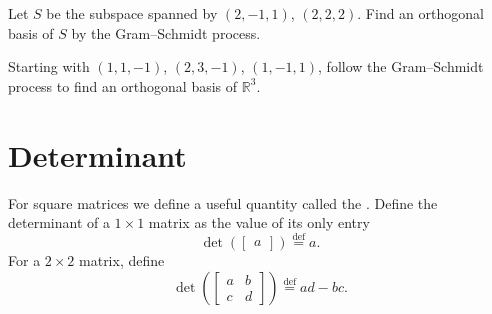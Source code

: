 \begin{exercise}
Let $S$ be the subspace spanned by
$(2,-1,1)$, $(2,2,2)$.  Find an orthogonal basis of $S$
by the Gram--Schmidt process.
\end{exercise}

\begin{exercise}
Starting with $(1,1,-1)$, $(2,3,-1)$, $(1,-1,1)$, follow the Gram--Schmidt
process to find an orthogonal basis of ${\mathbb{R}}^3$.
\end{exercise}


\sectionnewpage
\section{Determinant}
\label{det:section}


For square matrices we define a useful quantity called the
\emph{}.  Define
the determinant of a $1 \times 1$ matrix as the value of its only entry
\begin{equation*}
\det \left(
\begin{bmatrix}
a
\end{bmatrix}
\right)
\overset{\text{def}}{=}
a .
\end{equation*}
For a $2 \times 2$ matrix, define
\begin{equation*}
\det \left(
\begin{bmatrix}
a & b \\
c & d
\end{bmatrix}
\right)
\overset{\text{def}}{=}
ad-bc .
\end{equation*}


